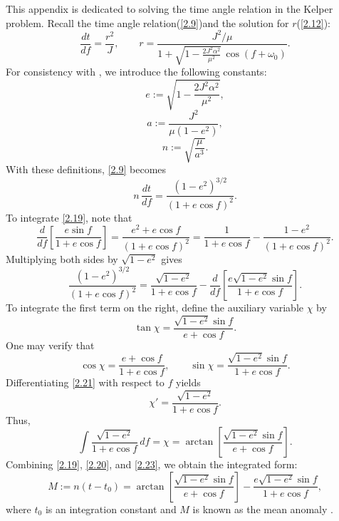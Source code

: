 \documentclass[12pt,oneside]{report}
\theoremstyle{definition}
\begin{document}
This appendix is dedicated to solving the time angle relation in the Kelper problem. Recall the time angle relation(\autoref{2.9})and the solution for \(r\)(\autoref{2.12}):
\[
\frac{dt}{df} = \frac{r^2}{J}, \qquad
r = \frac{J^2/\mu}{1 + \sqrt{1 - \frac{2J^2\alpha^2}{\mu^2}}\, \cos(f+\omega_0)}.
\]
For consistency with \cite{o2008integrable}, we introduce the following constants:
\begin{equation}\label{2.16}
e := \sqrt{1 - \frac{2J^2\alpha^2}{\mu^2}},
\end{equation}
\begin{equation}\label{2.17}
a := \frac{J^2}{\mu(1-e^2)},
\end{equation}
\begin{equation}\label{2.18}
n := \sqrt{\frac{\mu}{a^3}}.
\end{equation}
With these definitions, \autoref{2.9} becomes
\begin{equation}\label{2.19}
n\,\frac{dt}{df} = \frac{(1-e^2)^{3/2}}{(1+e\cos f)^2}.
\end{equation}
To integrate \autoref{2.19}, note that
\[
\frac{d}{df}\left[\frac{e\sin f}{1+e\cos f}\right] 
=\frac{e^2+e\cos f}{(1+e\cos f)^2}
=\frac{1}{1+e\cos f} - \frac{1-e^2}{(1+e\cos f)^2}.
\]
Multiplying both sides by \(\sqrt{1-e^2}\) gives
\begin{equation}\label{2.20}
\frac{(1-e^2)^{3/2}}{(1+e\cos f)^2} 
= \frac{\sqrt{1-e^2}}{1+e\cos f} - \frac{d}{df}\left[\frac{e\sqrt{1-e^2}\sin f}{1+e\cos f}\right].
\end{equation}
To integrate the first term on the right, define the auxiliary variable \(\chi\) by
\begin{equation}\label{2.21}
\tan\chi = \frac{\sqrt{1-e^2}\sin f}{e+\cos f}.
\end{equation}
One may verify that
\[
\cos\chi = \frac{e+\cos f}{1+e\cos f}, \qquad
\sin\chi = \frac{\sqrt{1-e^2}\sin f}{1+e\cos f}.
\]
Differentiating \autoref{2.21} with respect to \(f\) yields
\begin{equation}\label{2.22}
\chi' = \frac{\sqrt{1-e^2}}{1+e\cos f}.
\end{equation}
Thus,
\begin{equation}\label{2.23}
\int \frac{\sqrt{1-e^2}}{1+e\cos f}\,df = \chi = \arctan\left[\frac{\sqrt{1-e^2}\sin f}{e+\cos f}\right].
\end{equation}
Combining \autoref{2.19}, \autoref{2.20}, and \autoref{2.23}, we obtain the integrated form:
\begin{equation}\label{2.24}
M := n(t-t_0) = \arctan\left[\frac{\sqrt{1-e^2}\sin f}{e+\cos f}\right] - \frac{e\sqrt{1-e^2}\sin f}{1+e\cos f},
\end{equation}
where \(t_0\) is an integration constant and \(M\) is known as the mean anomaly \cite{o2008integrable}.
\end{document}
